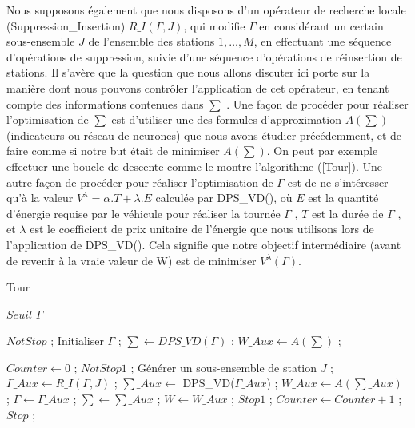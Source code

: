 {	Nous supposons également que nous disposons d'un opérateur de recherche locale (Suppression\_Insertion) $R\_I(\Gamma, J)$, qui modifie $\Gamma$ en considérant un certain sous-ensemble $J$ de l'ensemble des stations $1, \dots, M$, en effectuant une séquence d'opérations de suppression, suivie d'une séquence d'opérations de réinsertion de stations. Il s'avère que la question que nous allons discuter ici porte sur la manière dont nous pouvons contrôler l'application de cet opérateur, en tenant compte des informations contenues dans $\sum$ . 
	Une façon de procéder pour réaliser l'optimisation de $\sum$ est d'utiliser une des formules d'approximation $A(\sum)$ (indicateurs ou réseau de neurones) que nous avons étudier précédemment, et de faire comme si notre but était de minimiser $A(\sum)$. On peut par exemple effectuer une boucle de descente comme le montre l'algorithme (\ref{Tour}). Une autre façon de procéder pour réaliser l'optimisation de $\Gamma$ est de ne s'intéresser qu'à la valeur $V^\lambda= \alpha.T + \lambda .E$ calculée par DPS\_VD(), où $E$ est la quantité d'énergie requise par le véhicule pour réaliser la tournée $\Gamma$ , $T$ est la durée de $\Gamma$ , et $\lambda$ est le coefficient de prix unitaire de l'énergie que nous utilisons lors de l'application de DPS\_VD(). Cela signifie que notre objectif intermédiaire (avant de revenir à la vraie valeur de W) est de minimiser $V^\lambda(\Gamma)$.
	
	
	\begin{algorithm}
		\caption{Tour}
		\label{Tour}
		\begin{algorithmic}[1]
			\REQUIRE $Seuil$
			\ENSURE $\Gamma$
			\hline
			\vspace{0.5cm}
			
			\INITIALISATION
			\STATE $NotStop$ ;
			\STATE Initialiser $\Gamma$ ;
			\STATE $\sum \leftarrow DPS\_VD(\Gamma)$ ;
			\STATE $W\_Aux \leftarrow A(\sum)$ ;
			
			\vspace{0.3cm}
			
			\BOUCLEPRINCIPAL
			\STATE $Counter \leftarrow 0 $ ;
			\STATE $NotStop1$ ;
			\STATE Générer un sous-ensemble de station $J$ ; \label{generate}
			\STATE $\Gamma\_Aux \leftarrow R\_I(\Gamma,J)$ ; \label{RI}
			\STATE $\sum\_Aux \leftarrow$ DPS\_VD($\Gamma\_Aux$) ;
			\STATE $W\_Aux \leftarrow A(\sum\_Aux)$ ;
			\STATE $ \Gamma \leftarrow \Gamma\_Aux$ ; $\sum \leftarrow \sum\_Aux$ ; $ W \leftarrow W\_Aux$ ; $Stop1$ ;
			\ELSE
			\STATE $Counter \leftarrow Counter +1$ ;
			\STATE $Stop$ ;
			\ENDIF
			\ENDIF
			\ENDWHILE
			\ENDWHILE
		\end{algorithmic}
	\end{algorithm}
	
}
